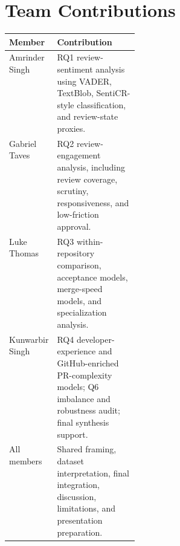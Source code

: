 \documentclass[sigconf,nonacm]{acmart}
\begin{document}
\section{Team Contributions}

\begin{center}
\small
\begin{tabularx}{\linewidth}{>{\raggedright\arraybackslash}p{0.25\linewidth}X}
\toprule
Member & Contribution \\
\midrule
Amrinder Singh & RQ1 review-sentiment analysis using VADER, TextBlob, SentiCR-style classification, and review-state proxies. \\
Gabriel Taves & RQ2 review-engagement analysis, including review coverage, scrutiny, responsiveness, and low-friction approval. \\
Luke Thomas & RQ3 within-repository comparison, acceptance models, merge-speed models, and specialization analysis. \\
Kunwarbir Singh & RQ4 developer-experience and GitHub-enriched PR-complexity models; Q6 imbalance and robustness audit; final synthesis support. \\
All members & Shared framing, dataset interpretation, final integration, discussion, limitations, and presentation preparation. \\
\bottomrule
\end{tabularx}
\end{center}
\end{document}
